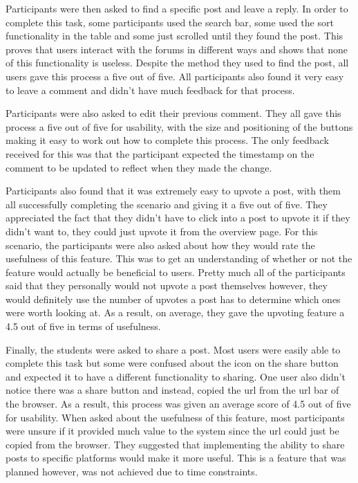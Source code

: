 Participants were then asked to find a specific post and leave a reply.
In order to complete this task, some participants used the search bar, some used the sort functionality in the table and some just scrolled until they found the post.
This proves that users interact with the forums in different ways and shows that none of this functionality is useless.
Despite the method they used to find the post, all users gave this process a five out of five.
All participants also found it very easy to leave a comment and didn't have much feedback for that process.

Participants were also asked to edit their previous comment.
They all gave this process a five out of five for usability, with the size and positioning of the buttons making it easy to work out how to complete this process.
The only feedback received for this was that the participant expected the timestamp on the comment to be updated to reflect when they made the change.

Participants also found that it was extremely easy to upvote a post, with them all successfully completing the scenario and giving it a five out of five.
They appreciated the fact that they didn't have to click into a post to upvote it if they didn't want to, they could just upvote it from the overview page.
For this scenario, the participants were also asked about how they would rate the usefulness of this feature.
This was to get an understanding of whether or not the feature would actually be beneficial to users.
Pretty much all of the participants said that they personally would not upvote a post themselves however, they would definitely use the number of upvotes a post has to determine which ones were worth looking at.
As a result, on average, they gave the upvoting feature a 4.5 out of five in terms of usefulness.

Finally, the students were asked to share a post.
Most users were easily able to complete this task but some were confused about the icon on the share button and expected it to have a different functionality to sharing.
One user also didn't notice there was a share button and instead, copied the url from the url bar of the browser.
As a result, this process was given an average score of 4.5 out of five for usability.
When asked about the usefulness of this feature, most participants were unsure if it provided much value to the system since the url could just be copied from the browser.
They suggested that implementing the ability to share posts to specific platforms would make it more useful.
This is a feature that was planned however, was not achieved due to time constraints.

